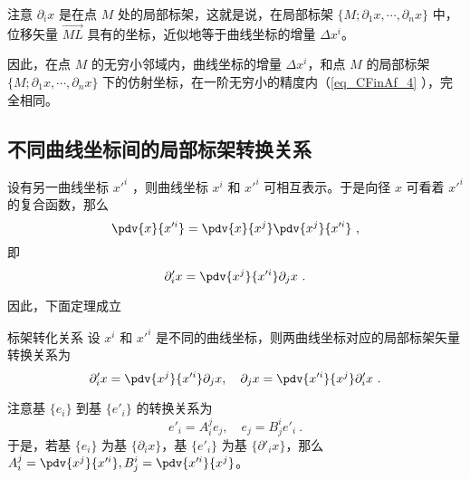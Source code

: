 注意 $\partial_i x$ 是在点 $M$ 处的局部标架，这就是说，在局部标架 $\{M;\partial_1 x,\cdots,\partial_n x\}$ 中，位移矢量 $\overrightarrow{ML}$ 具有的坐标，近似地等于曲线坐标的增量 $\Delta x^i$。

因此，在点 $M$ 的无穷小邻域内，曲线坐标的增量 $\Delta x^i$，和点 $M$ 的局部标架 $\{M;\partial_1 x,\cdots,\partial_n x\}$ 下的仿射坐标，在一阶无穷小的精度内（\autoref{eq_CFinAf_4} ），完全相同。

\subsection{不同曲线坐标间的局部标架转换关系}\label{sub_CFinAf_1}

设有另一曲线坐标 $x'^i$ ，则曲线坐标 $x^i$ 和 $x'^i$ 可相互表示。于是向径 $x$ 可看着 $x'^i$ 的复合函数，那么
\begin{equation}
\pdv{x}{x'^i}=\pdv{x}{x^j}\pdv{x^j}{x'^i}~,
\end{equation}
 即
 \begin{equation}
 \partial'_i x=\pdv{x^j}{x'^i}\partial_j x~.
 \end{equation}
 
因此，下面定理成立
\begin{theorem}{标架转化关系}
设 $x^i$ 和 $x'^i$ 是不同的曲线坐标，则两曲线坐标对应的局部标架矢量转换关系为
\begin{equation}\label{eq_CFinAf_5}
\partial'_i x=\pdv{x^j}{x'^i}\partial_j x,\quad \partial_j x=\pdv{x'^i}{x^j}\partial'_i x~.
\end{equation}
\end{theorem}
注意基 $\{e_i\}$ 到基 $\{e'_i\}$ 的转换关系为
\begin{equation}
e'_i=A^j_i e_j,\quad e_j=B^i_j e'_i~.
\end{equation}
于是，若基 $\{e_i\}$ 为基 $\{\partial_i x\}$，基 $\{e'_i\}$ 为基 $\{\partial'_i x\}$，那么 $A^j_i=\pdv{x^j}{x'^i},B^i_j=\pdv{x'^i}{x^j}$。
